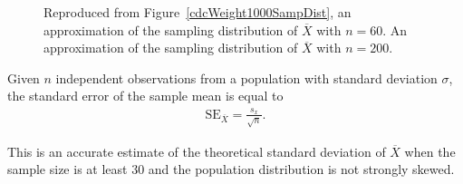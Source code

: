 \begin{figure}[h!]
	\centering
	\caption{ Reproduced from Figure~\ref{cdcWeight1000SampDist}, an approximation of the sampling distribution of $\overline{X}$ with $n = 60$.  An approximation of the sampling distribution of $\overline{X}$ with $n = 200$.}
	\label{cdcSamplingVariabilityComparison}
\end{figure}


\begin{termBox}{
		Given $n$ independent observations from a population with standard deviation $\sigma$, the standard error of the sample mean is equal to \vspace{-1mm}
		\begin{align*}
          \text{SE}_{\overline{X}} = \frac{s_x}{\sqrt{n}}.
		\label{seOfXBar}
		\end{align*}\vspace{-3mm}%
		
        This is an accurate estimate of the theoretical standard deviation of $\overline{X}$ when the sample size is at least 30 and the population distribution is not strongly skewed.}
\end{termBox}

